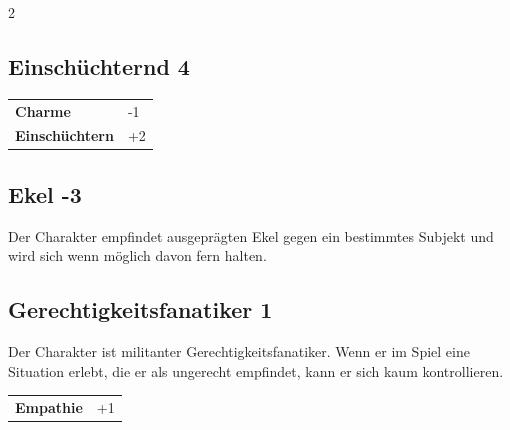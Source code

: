 \begin{multicols}{2}
\begin{tcolorbox}
\end{tcolorbox}

\begin{tcolorbox}
    \subsection*{Einschüchternd \hfill \small{4 }}
    \tcblower




\begin{tabular}{@{}ll@{}}
    \textbf{Charme} & -1\\
    \textbf{Einschüchtern} & +2\\
\end{tabular}


\end{tcolorbox}

\begin{tcolorbox}
    \subsection*{Ekel \hfill \small{-3 }}
    \tcblower
Der Charakter empfindet ausgeprägten Ekel gegen ein bestimmtes Subjekt und wird sich wenn möglich davon fern halten.


\vspace{3mm}



\end{tcolorbox}

\begin{tcolorbox}
    \subsection*{Gerechtigkeitsfanatiker \hfill \small{1 }}
    \tcblower
Der Charakter ist militanter Gerechtigkeitsfanatiker. Wenn er im Spiel eine Situation erlebt, die er als ungerecht empfindet, kann er sich kaum kontrollieren.


\vspace{3mm}

\begin{tabular}{@{}ll@{}}
    \textbf{Empathie} & +1\\
\end{tabular}


\end{tcolorbox}
\end{multicols}
